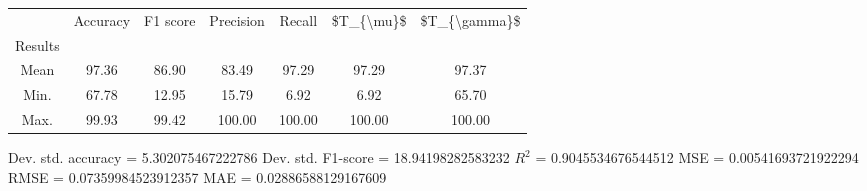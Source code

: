 \begin{tabular}{|c|c|c|c|c|c|c|}
\toprule
{} &  Accuracy &  F1 score &  Precision &  Recall &  \$T\_\{\textbackslash mu\}\$ &  \$T\_\{\textbackslash gamma\}\$ \\
Results &           &           &            &         &            &               \\
\hline
Mean    &     97.36 &     86.90 &      83.49 &   97.29 &      97.29 &         97.37 \\
Min.    &     67.78 &     12.95 &      15.79 &    6.92 &       6.92 &         65.70 \\
Max.    &     99.93 &     99.42 &     100.00 &  100.00 &     100.00 &        100.00 \\
\bottomrule
\end{tabular}

 Dev. std. accuracy = 5.302075467222786
 Dev. std. F1-score = 18.94198282583232
 $R^2$ = 0.9045534676544512
 MSE = 0.00541693721922294
 RMSE = 0.07359984523912357
 MAE = 0.02886588129167609